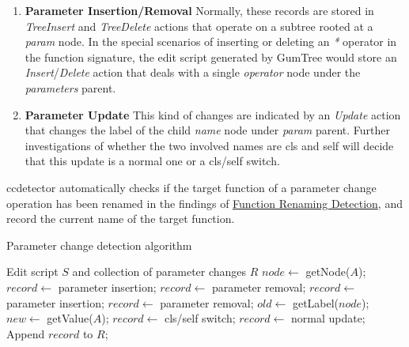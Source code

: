 \begin{figure}[!t]
	
	\vspace{-5mm}
\end{figure}

\begin{enumerate}
	\item \textbf{Parameter Insertion/Removal} Normally, these records are stored in \textit{TreeInsert} and \textit{TreeDelete} actions that operate on a subtree rooted at a \textit{param} node. In the special scenarios of inserting or deleting an \textit{*} operator in the function signature, the edit script generated by GumTree would store an \textit{Insert}/\textit{Delete} action that deals with a single \textit{operator} node under the \textit{parameters} parent.
	\item \textbf{Parameter Update} This kind of changes are indicated by an \textit{Update} action that changes the label of the child \textit{name} node under \textit{param} parent. Further investigations of whether the two involved names are cls and self will decide that this update is a normal one or a cls/self switch.
\end{enumerate}

ccdetector automatically checks if the target function of a parameter change operation has been renamed in the findings of \hyperref[subsec:func-rename-detect]{Function Renaming Detection}, and record the current name of the target function.

\begin{algorithm}
	\label{algo:parameter-change-detection}
	\caption{Parameter change detection algorithm}
	\begin{algorithmic}[1]
		\REQUIRE Edit script $S$ and collection of parameter changes $R$
			\STATE $node \gets$ getNode($A$);
				\STATE $record \gets$ parameter insertion;
				\STATE $record \gets$ parameter removal;
				\STATE $record \gets$ parameter insertion;
				\STATE $record \gets$ parameter removal;
				\STATE $old \gets$ getLabel($node$);
				\STATE $new \gets$ getValue($A$);
					\STATE $record \gets$ cls/self switch;
				\ELSE
					\STATE $record \gets$ normal update;
				\ENDIF
			\ENDIF
			\STATE Append $record$ to $R$;
		\ENDFOR
	\end{algorithmic}
\end{algorithm}

